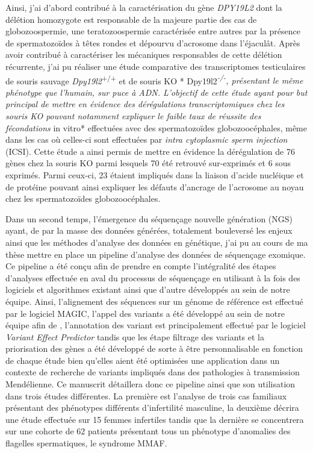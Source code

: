 \documentclass[12pt,twoside]{reedthesis}
\theoremstyle{definition}
\theoremstyle{definition}
\theoremstyle{remark}
\begin{document}
  Ainsi, j'ai d'abord contribué à la caractérisation du gène
  \emph{DPY19L2} dont la délétion homozygote est responsable de la majeure
  partie des cas de globozoospermie, une teratozoospermie caractérisée
  entre autres par la présence de spermatozoïdes à têtes rondes et
  dépourvu d'acrosome dans l'éjaculât. Après avoir contribué à
  caractériser les mécaniques responsables de cette délétion récurrente,
  j'ai pu réaliser une étude comparative des transcriptomes testiculaires
  de souris sauvage \emph{Dpy19l2}\textsuperscript{+/+} et de souris KO *
  Dpy19l2\emph{\textsuperscript{-/-}, présentant le même phénotype que
  l'humain, sur puce à ADN. L'objectif de cette étude ayant pour but
  principal de mettre en évidence des dérégulations transcriptomiques chez
  les souris KO pouvant notamment expliquer le faible taux de réussite des
  fécondations }in vitro* effectuées avec des spermatozoïdes
  globozoocéphales, même dans les cas où celles-ci sont effectuées par
  \emph{intra cytoplasmic sperm injection} (ICSI). Cette étude a ainsi
  permis de mettre en évidence la dérégulation de 76 gènes chez la souris
  KO parmi lesquels 70 été retrouvé sur-exprimés et 6 sous exprimés. Parmi
  ceux-ci, 23 étaient impliqués dans la liaison d'acide nucléique et de
  protéine pouvant ainsi expliquer les défauts d'ancrage de l'acrosome au
  noyau chez les spermatozoïdes globozoocéphales.
  
  Dans un second temps, l'émergence du séquençage nouvelle génération
  (NGS) ayant, de par la masse des données générées, totalement bouleversé
  les enjeux ainsi que les méthodes d'analyse des données en génétique,
  j'ai pu au cours de ma thèse mettre en place un pipeline d'analyse des
  données de séquençage exomique. Ce pipeline a été conçu afin de prendre
  en compte l'intégralité des étapes d'analyses effectuée en aval du
  processus de séquençage en utilisant à la fois des logiciels et
  algorithmes existant ainsi que d'autre développés au sein de notre
  équipe. Ainsi, l'alignement des séquences sur un génome de référence est
  effectué par le logiciel MAGIC, l'appel des variants a été développé au
  sein de notre équipe afin de , l'annotation des variant est
  principalement effectué par le logiciel \emph{Variant Effect Predictor}
  tandis que les étape filtrage des variants et la priorisation des gènes
  a été développé de sorte à être personnalisable en fonction de chaque
  étude bien qu'elles aient été optimisées une application dans un
  contexte de recherche de variants impliqués dans des pathologies à
  transmission Mendélienne. Ce manuscrit détaillera donc ce pipeline ainsi
  que son utilisation dans trois études différentes. La première est
  l'analyse de trois cas familiaux présentant des phénotypes différents
  d'infertilité masculine, la deuxième décrira une étude effectuée sur 15
  femmes infertiles tandis que la dernière se concentrera sur une cohorte
  de 62 patients présentant tous un phénotype d'anomalies des flagelles
  spermatiques, le syndrome MMAF.
  
\end{document}
